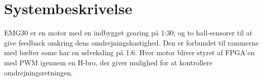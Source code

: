 \section{Systembeskrivelse}
EMG30\cite{emg30Data} er en motor med en indbygget gearing på 1:30, og to hall-sensorer til at give feedback omkring dens omdrejningshastighed. Den er forbundet til rammerne med bælter some har en udveksling på 1:6. Hver motor bliver styret af FPGA'en med PWM igennem en H-bro, der giver mulighed for at kontrollere omdrejningsretningen.